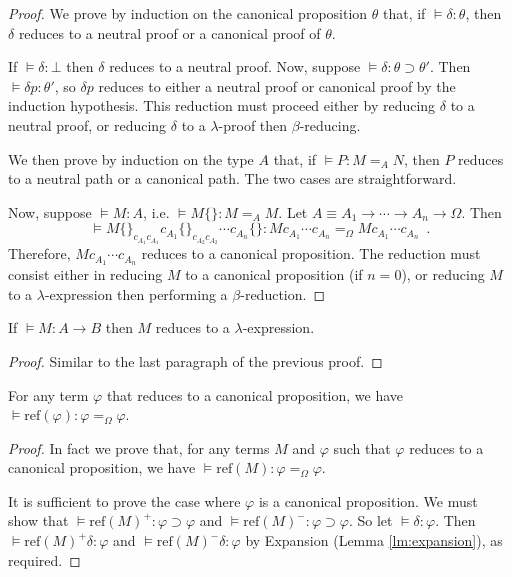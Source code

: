 \documentclass[a4paper,UKenglish]{lipics-v2016}
\newcommand*{\reff}[1]{\ensuremath{\mathrm{ref} \left( {#1} \right)}}
\theoremstyle{plain}
\theoremstyle{definition}
\begin{document}
\begin{proof}
We prove by induction on the canonical proposition $\theta$ that, if $\models \delta : \theta$, then $\delta$ reduces to a neutral proof or
a canonical proof of $\theta$.

If $\models \delta : \bot$ then $\delta$ reduces to a neutral proof.  Now, suppose $\models \delta : \theta \supset \theta'$.  Then $\models \delta p :
\theta'$, so $\delta p$ reduces to either a neutral proof or canonical proof by the induction hypothesis.  This reduction must proceed either by
reducing $\delta$ to a neutral proof, or reducing $\delta$ to a $\lambda$-proof then $\beta$-reducing.

We then prove by induction on the type $A$ that, if $\models P : M =_A N$, then $P$ reduces to a neutral path or a canonical path. The two cases are straightforward.

Now, suppose $\models M : A$, i.e. $\models M \{\} : M =_A M$.  Let $A \equiv A_1 \rightarrow \cdots \rightarrow A_n \rightarrow \Omega$.  Then
$$ \models M \{\}_{c_{A_1} c_{A_1}} c_{A_1} \{\}_{c_{A_2} c_{A_2}} \cdots c_{A_n} \{\}
: M c_{A_1} \cdots c_{A_n} =_\Omega M c_{A_1} \cdots c_{A_n} \enspace . $$
Therefore, $M c_{A_1} \cdots c_{A_n}$ reduces to a canonical proposition.  The reduction must consist either in reducing $M$ to a canonical proposition (if $n = 0$),
or reducing $M$ to a $\lambda$-expression then performing a $\beta$-reduction.
\end{proof}

\begin{lemma}
\label{lm:pre-ref-compute}
If $\models M : A \rightarrow B$ then $M$ reduces to a $\lambda$-expression.
\end{lemma}

\begin{proof}
Similar to the last paragraph of the previous proof.
\end{proof}

\begin{lemma}
\label{lm:ref-compute-Omega}
For any term $\varphi$ that reduces to a canonical proposition, we have $\models \reff{\varphi} : \varphi =_\Omega \varphi$.
\end{lemma}

\begin{proof}
In fact we prove that, for any terms $M$ and $\varphi$ such that $\varphi$ reduces to a canonical proposition, we have
$\models \reff{M} : \varphi =_\Omega \varphi$.

It is sufficient to prove the case where $\varphi$ is a canonical proposition.
We must show that $\models \reff{M}^+ : \varphi \supset \varphi$ and $\models \reff{M}^- : \varphi \supset \varphi$.  So let $\models \delta : \varphi$.
Then $\models \reff{M}^+ \delta : \varphi$ and $\models \reff{M}^- \delta : \varphi$ by Expansion (Lemma \ref{lm:expansion}), as required.
\end{proof}
\end{document}
